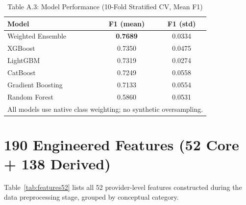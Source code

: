 \begin{table}[H]
\centering
\caption{Table A.3: Model Performance (10-Fold Stratified CV, Mean F1)}
\label{tab:model_performance}
\begin{tabular}{lcc}
\toprule
\textbf{Model} & \textbf{F1 (mean)} & \textbf{F1 (std)} \\
\midrule
Weighted Ensemble   & \textbf{0.7689} & 0.0334 \\
XGBoost             & 0.7350 & 0.0475 \\
LightGBM            & 0.7319 & 0.0274 \\
CatBoost            & 0.7249 & 0.0558 \\
Gradient Boosting   & 0.7133 & 0.0554 \\
Random Forest       & 0.5860 & 0.0531 \\
\bottomrule
\multicolumn{3}{l}{\small All models use native class weighting; no synthetic oversampling.}
\end{tabular}
\end{table}

\section{190 Engineered Features (52 Core + 138 Derived)}

Table~\ref{tab:features52} lists all 52 provider-level features constructed during the data preprocessing stage, grouped by conceptual category.

